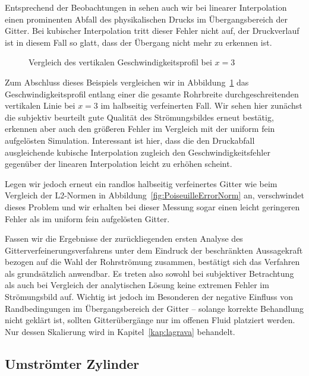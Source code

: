 Entsprechend der Beobachtungen in \cite[Kap.~3.7]{lagrava12} sehen auch wir bei linearer Interpolation einen prominenten Abfall des physikalischen Drucks im Übergangsbereich der Gitter. Bei kubischer Interpolation tritt dieser Fehler nicht auf, der Druckverlauf ist in diesem Fall so glatt, dass der Übergang nicht mehr zu erkennen ist.

\begin{figure}[h]
\begin{adjustbox}{center}

\end{adjustbox}
\caption{Vergleich des vertikalen Geschwindigkeitsprofil bei \(x=3\)}
\label{fig:PoiseuilleOutflowProfile}
\end{figure}

Zum Abschluss dieses Beispiels vergleichen wir in Abbildung~\ref{fig:PoiseuilleOutflowProfile} das Geschwindigkeitsprofil entlang einer die gesamte Rohrbreite durchgeschreitenden vertikalen Linie bei \(x=3\) im halbseitig verfeinerten Fall. Wir sehen hier zunächst die subjektiv beurteilt gute Qualität des Strömungsbildes erneut bestätig, erkennen aber auch den größeren Fehler im Vergleich mit der uniform fein aufgelösten Simulation. Interessant ist hier, dass die den Druckabfall ausgleichende kubische Interpolation zugleich den Geschwindigkeitsfehler gegenüber der linearen Interpolation leicht zu erhöhen scheint.

Legen wir jedoch erneut ein randlos halbseitig verfeinertes Gitter wie beim Vergleich der L2-Normen in Abbildung~\ref{fig:PoiseuilleErrorNorm} an, verschwindet dieses Problem und wir erhalten bei dieser Messung sogar einen leicht geringeren Fehler als im uniform fein aufgelösten Gitter.

\bigskip

Fassen wir die Ergebnisse der zurückliegenden ersten Analyse des Gitterverfeinerungsverfahrens unter dem Eindruck der beschränkten Aussagekraft bezogen auf die Wahl der Rohrströmung zusammen, bestätigt sich das Verfahren als grundsätzlich anwendbar. Es treten also sowohl bei subjektiver Betrachtung als auch bei Vergleich der analytischen Lösung keine extremen Fehler im Strömungsbild auf. Wichtig ist jedoch im Besonderen der negative Einfluss von Randbedingungen im Übergangsbereich der Gitter -- solange korrekte Behandlung nicht geklärt ist, sollten Gitterübergänge nur im offenen Fluid platziert werden. Nur dessen Skalierung wird in Kapitel~\ref{kap:lagrava} behandelt.

\newpage
\subsection{Umströmter Zylinder}

